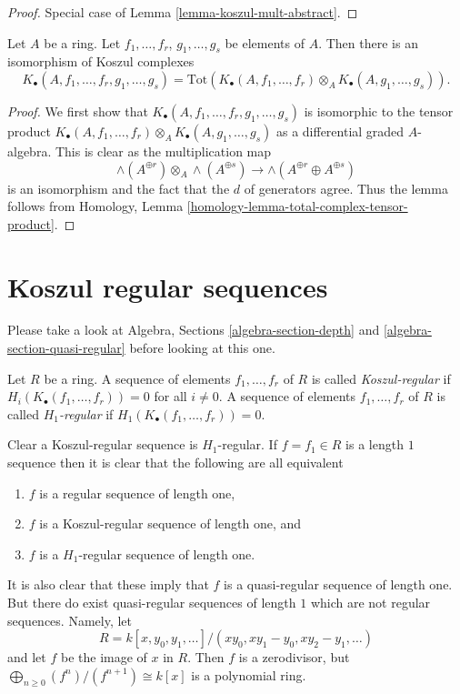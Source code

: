 \begin{proof}
Special case of
Lemma \ref{lemma-koszul-mult-abstract}.
\end{proof}

\begin{lemma}
\label{lemma-join-sequences-koszul-complex}
Let $A$ be a ring.
Let $f_1, \ldots, f_r$, $g_1, \ldots, g_s$ be elements of $A$.
Then there is an isomorphism of Koszul complexes
$$
K_\bullet(A, f_1, \ldots, f_r, g_1, \ldots, g_s) =
\text{Tot}(K_\bullet(A, f_1, \ldots, f_r) \otimes_A
K_\bullet(A, g_1, \ldots, g_s)).
$$
\end{lemma}

\begin{proof}
We first show that $K_\bullet(A, f_1, \ldots, f_r, g_1, \ldots, g_s)$ is
isomorphic to the tensor product
$K_\bullet(A, f_1, \ldots, f_r) \otimes_A K_\bullet(A, g_1, \ldots, g_s)$
as a differential graded $A$-algebra. This is clear as the multiplication map
$$
\wedge(A^{\oplus r}) \otimes_A \wedge(A^{\oplus s})
\longrightarrow
\wedge(A^{\oplus r} \oplus A^{\oplus s})
$$
is an isomorphism and the fact that the $d$ of generators agree.
Thus the lemma follows from
Homology, Lemma \ref{homology-lemma-total-complex-tensor-product}.
\end{proof}





\section{Koszul regular sequences}
\label{section-koszul-regular}

\noindent
Please take a look at
Algebra, Sections \ref{algebra-section-depth} and
\ref{algebra-section-quasi-regular}
before looking at this one.

\begin{definition}
\label{definition-koszul-regular-sequence}
Let $R$ be a ring.
A sequence of elements $f_1, \ldots, f_r$ of $R$ is called
{\it Koszul-regular} if $H_i(K_\bullet(f_1, \ldots, f_r)) = 0$ for
all $i \not = 0$.
A sequence of elements $f_1, \ldots, f_r$ of $R$ is called
{\it $H_1$-regular} if $H_1(K_\bullet(f_1, \ldots, f_r)) = 0$.
\end{definition}

\noindent
Clear a Koszul-regular sequence is $H_1$-regular. If $f = f_1 \in R$
is a length $1$ sequence then it is clear that the following are
all equivalent
\begin{enumerate}
\item $f$ is a regular sequence of length one,
\item $f$ is a Koszul-regular sequence of length one, and
\item $f$ is a $H_1$-regular sequence of length one.
\end{enumerate}
It is also clear that these imply that $f$ is a quasi-regular sequence
of length one. But there do exist quasi-regular sequences of length $1$
which are not regular sequences. Namely, let
$$
R = k[x, y_0, y_1, \ldots]/(xy_0, xy_1 - y_0, xy_2 - y_1, \ldots)
$$
and let $f$ be the image of $x$ in $R$. Then $f$ is a zerodivisor, but
$\bigoplus_{n \geq 0} (f^n)/(f^{n + 1}) \cong k[x]$ is a polynomial ring.

